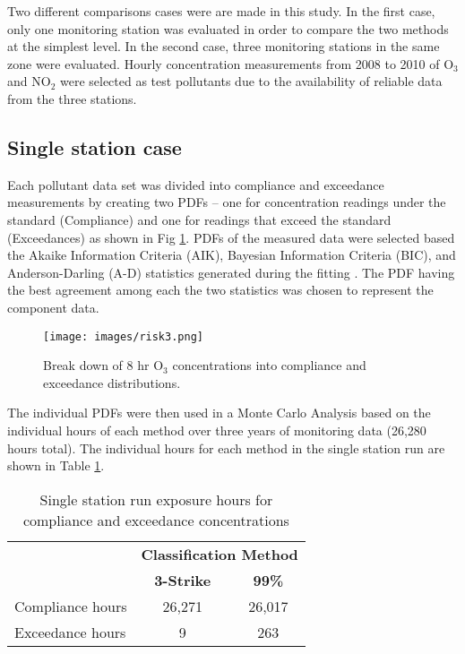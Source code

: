 Two different comparisons cases were are made in this study. In the first case, only one monitoring station was evaluated in order to compare the two methods at the simplest level. In the second case, three monitoring stations in the same zone were evaluated.  Hourly concentration measurements from 2008 to 2010 of O$_{3}$ and NO$_{2}$ were selected as test pollutants due to the availability of reliable data from the three stations. 

\subsection{Single station case}

Each pollutant data set was divided into compliance and exceedance measurements by creating two PDFs – one for concentration readings under the standard (Compliance) and one for readings that exceed the standard (Exceedances) as shown in Fig \ref{fig3:distributions}.  PDFs of the measured data were selected based the Akaike Information Criteria (AIK), Bayesian Information Criteria (BIC), and Anderson-Darling (A-D) statistics generated during the fitting \citep{Palisades2016}.  The PDF having the best agreement among each the two statistics was chosen to represent the component data.  
%  
\begin{figure}
\texttt{[image: images/risk3.png]} 
\caption{Break down of 8 hr O$_{3}$ concentrations into compliance and exceedance distributions.}
\label{fig3:distributions}
\end{figure}
%
The individual PDFs were then used in a Monte Carlo Analysis based on the individual hours of each method over three years of monitoring data (26,280 hours total).  The individual hours for each method in the single station run are shown in Table \ref{tb3:exphrs}. 
%
\begin{table}[!htb]
\centering
\caption{Single station run exposure hours for compliance and exceedance concentrations}
\label{tb3:exphrs}
\begin{tabular}{@{}lcc@{}}
\toprule
 & \multicolumn{2}{c}{\textbf{Classification Method}} \\ 
 & \textbf{3-Strike} & \textbf{99\%} \\ \midrule
Compliance hours & 26,271 & 26,017 \\
Exceedance hours & 9 & 263 \\ \bottomrule
\end{tabular}
\end{table}
